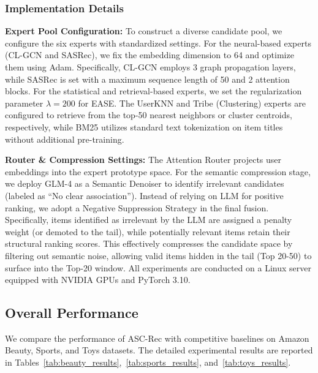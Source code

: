 \subsubsection{Implementation Details}
\textbf{Expert Pool Configuration:}
To construct a diverse candidate pool, we configure the six experts with standardized settings. For the neural-based experts (CL-GCN and SASRec), we fix the embedding dimension to 64 and optimize them using Adam. Specifically, CL-GCN employs 3 graph propagation layers, while SASRec is set with a maximum sequence length of 50 and 2 attention blocks. For the statistical and retrieval-based experts, we set the regularization parameter $\lambda=200$ for EASE. The UserKNN and Tribe (Clustering) experts are configured to retrieve from the top-50 nearest neighbors or cluster centroids, respectively, while BM25 utilizes standard text tokenization on item titles without additional pre-training.

\textbf{Router \& Compression Settings:}
The Attention Router projects user embeddings into the expert prototype space. For the semantic compression stage, we deploy GLM-4 as a Semantic Denoiser to identify irrelevant candidates (labeled as ``No clear association''). Instead of relying on LLM for positive ranking, we adopt a Negative Suppression Strategy in the final fusion. Specifically, items identified as irrelevant by the LLM are assigned a penalty weight (or demoted to the tail), while potentially relevant items retain their structural ranking scores. This effectively compresses the candidate space by filtering out semantic noise, allowing valid items hidden in the tail (Top 20-50) to surface into the Top-20 window. All experiments are conducted on a Linux server equipped with NVIDIA GPUs and PyTorch 3.10.

\subsection{Overall Performance}
\label{subsec:overall_performance}

We compare the performance of ASC-Rec with competitive baselines on Amazon Beauty, Sports, and Toys datasets. The detailed experimental results are reported in Tables~\ref{tab:beauty_results},~\ref{tab:sports_results}, and~\ref{tab:toys_results}.

